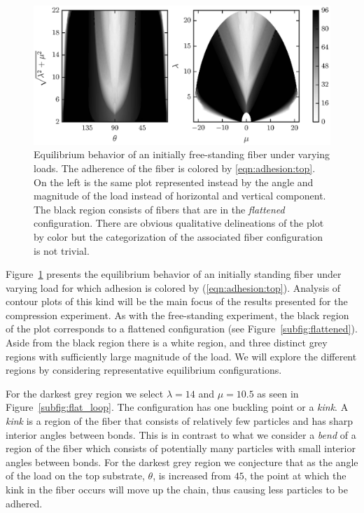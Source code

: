 	\begin{figure}[t]
		\begin{center}
			\includegraphics{./fig/ch3/push/ref/grid.eps}
		\end{center}		
		\caption{Equilibrium behavior of an initially free-standing fiber under varying loads. The adherence of the fiber is colored by \ref{eqn:adhesion:top}. On the left is the same plot represented instead by the angle and magnitude of the load instead of horizontal and vertical component. The black region consists of fibers that are in the \textit{flattened} configuration. There are obvious qualitative delineations of the plot by color but the categorization of the associated fiber configuration is not trivial.
		\label{fig:push:ref}}
	\end{figure}

Figure~\ref{fig:push:ref} presents the equilibrium behavior of an initially standing fiber under varying load for which adhesion is colored by (\ref{eqn:adhesion:top}). Analysis of contour plots of this kind will be the main focus of the results presented for the compression experiment. As with the free-standing experiment, the black region of the plot corresponds to a flattened configuration (see Figure~\ref{subfig:flattened}). Aside from the black region there is a white region, and three distinct grey regions with sufficiently large magnitude of the load. We will explore the different regions by considering representative equilibrium configurations.

For the darkest grey region we select $\lambda=14$ and $\mu=10.5$ as seen in Figure~\ref{subfig:flat_loop}. The configuration has one buckling point or a \textit{kink}. A \textit{kink} is a region of the fiber that consists of relatively few particles and has sharp interior angles between bonds. This is in contrast to what we consider a \textit{bend} of a region of the fiber which consists of potentially many particles with small interior angles between bonds. For the darkest grey region we conjecture that as the angle of the load on the top substrate, $\theta$, is increased from $45$\textdegree, the point at which the kink in the fiber occurs will move up the chain, thus causing less particles to be adhered.

